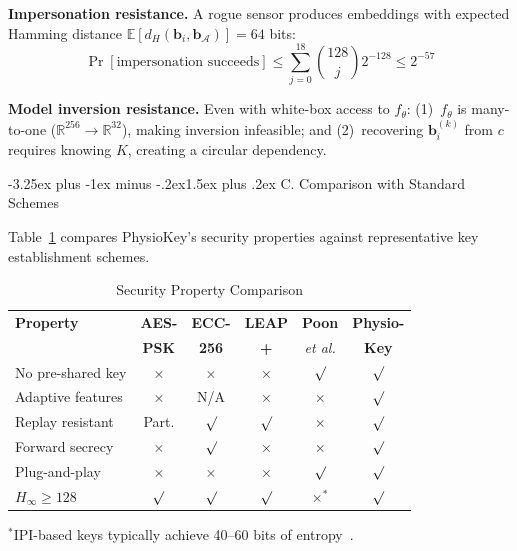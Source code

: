 \documentclass[10pt,twocolumn]{article}
\makeatletter
\renewcommand{\subsection}{\@startsection{subsection}{2}{\z@}%
  {-3.25ex plus -1ex minus -.2ex}{1.5ex plus .2ex}%
  {\normalfont\normalsize\bfseries\itshape}}
\newcommand{\etal}{\textit{et al.}}
\newcommand{\cmark}{$\surd$}
\newcommand{\xmark}{$\times$}
\makeatother
\begin{document}
\textbf{Impersonation resistance.} A rogue sensor produces embeddings with expected Hamming distance $\mathbb{E}[d_H(\mathbf{b}_i, \mathbf{b}_{\mathcal{A}})] = 64$ bits:
\begin{equation}
\Pr[\text{impersonation succeeds}] \leq \sum_{j=0}^{18} \binom{128}{j} 2^{-128} \leq 2^{-57}
\end{equation}

\textbf{Model inversion resistance.} Even with white-box access to $f_\theta$: (1)~$f_\theta$ is many-to-one ($\mathbb{R}^{256} \rightarrow \mathbb{R}^{32}$), making inversion infeasible; and (2)~recovering $\mathbf{b}_i^{(k)}$ from $c$ requires knowing $K$, creating a circular dependency.

\subsection{C. Comparison with Standard Schemes}
\label{subsec:security_comparison}

Table~\ref{tab:security_comparison} compares PhysioKey's security properties against representative key establishment schemes.

\begin{table}[!t]
\centering
\caption{Security Property Comparison}
\label{tab:security_comparison}
\small
\begin{tabular}{l|c|c|c|c|c}
\hline
\textbf{Property} & \textbf{AES-} & \textbf{ECC-} & \textbf{LEAP} & \textbf{Poon} & \textbf{Physio-} \\
 & \textbf{PSK} & \textbf{256} & \textbf{+} & \etal & \textbf{Key} \\
\hline\hline
No pre-shared key & \xmark & \xmark & \xmark & \cmark & \cmark \\
\hline
Adaptive features & \xmark & N/A & \xmark & \xmark & \cmark \\
\hline
Replay resistant & Part. & \cmark & \cmark & \xmark & \cmark \\
\hline
Forward secrecy & \xmark & \cmark & \xmark & \xmark & \cmark \\
\hline
Plug-and-play & \xmark & \xmark & \xmark & \cmark & \cmark \\
\hline
$H_\infty \geq 128$ & \cmark & \cmark & \cmark & \xmark$^*$ & \cmark \\
\hline
\end{tabular}

\smallskip
\noindent\footnotesize{$^*$IPI-based keys typically achieve 40--60 bits of entropy~\cite{rostami2013heart}.}
\end{table}
\end{document}

